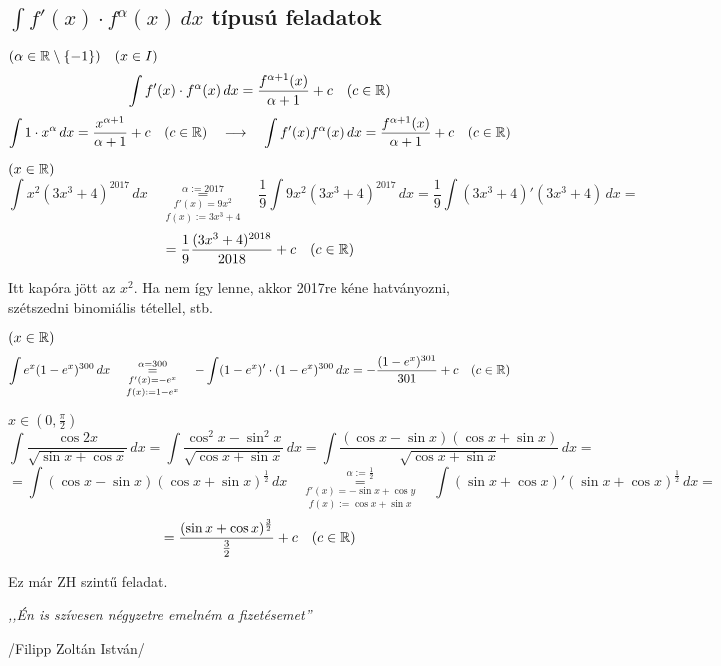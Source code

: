 \documentclass[a4paper,11.5pt]{article}
\begin{document}
	\subsection{$\int f'(x)\cdot f^\alpha(x)\,dx$ típusú feladatok}
	\begin{task} $(\alpha\in\mathbb{R}\setminus\{-1\})\quad (x\in I)$
		\[ \int f'(x)\cdot f^\alpha(x)\,dx=\frac{f^{\alpha+1}(x)}{\alpha+1}+c\quad (c\in\mathbb{R}) \]
		\[ \int 1\cdot x^\alpha\,dx=\frac{x^{\alpha+1}}{\alpha+1}+c\quad (c\in\mathbb{R})\quad \longrightarrow\quad \int f'(x)f^\alpha(x)\,dx=\frac{f^{\alpha+1}(x)}{\alpha+1}+c \quad (c\in\mathbb{R}) \]
	\end{task}
	\begin{task}
		$(x\in\mathbb{R})$
		\[ \int x^2(3x^3+4)^{2017}\,dx\quad \overset{\alpha:=2017}{\underset{f(x):=3x^3+4}{\underset{f'(x)=9x^2}{=}}}\quad \frac{1}{9}\int 9x^2(3x^3+4)^{2017}\,dx=\frac{1}{9}\int(3x^3+4)'(3x^3+4)\,dx=\]
		\[=\frac{1}{9}\frac{(3x^3+4)^{2018}}{2018}+c\quad (c\in\mathbb{R}) \]
		\begin{note}
			Itt kapóra jött az  $x^2$. Ha nem így lenne, akkor 2017re kéne hatványozni, szétszedni binomiális tétellel, stb.
		\end{note}
	\end{task}
	\begin{task}$(x\in\mathbb{R})$
		\[\int e^x (1-e^x)^{300}\,dx\quad \overset{\alpha=300}{\underset{f(x):=1-e^x}{\underset{f'(x)=-e^x}{=}}}\quad -\int(1-e^x)'\cdot(1-e^x)^{300}\,dx=-\frac{(1-e^x)^{301}}{301}+c\quad (c\in\mathbb{R}) \]
	\end{task}
	\begin{task}
		$x\in\left(0,\frac{\pi}{2}\right)$
		\[ \int\frac{\cos2x}{\sqrt{\sin x+\cos x}}\,dx = \int \frac{\cos^2 x-\sin^2 x}{\sqrt{\cos x+\sin x}}\,dx=\int\frac{(\cos x-\sin x)(\cos x+\sin x)}{\sqrt{\cos x+\sin x}}\,dx=\]
		\[=\int(\cos x-\sin x)(\cos x+\sin x)^{\frac{1}{2}}\,dx\quad \overset{\alpha:=\frac{1}{2}}{\underset{f(x):=\cos x+\sin x}{\underset{f'(x)=-\sin x+\cos y}{=}}}\quad \int(\sin x+\cos x)'(\sin x+\cos x)^{\frac{1}{2}}\,dx=\]
		\[=\frac{(\sin x + \cos x)^{\frac{3}{2}}}{\frac{3}{2}}+c\quad (c\in\mathbb{R}) \]
		\begin{note}
			Ez már ZH szintű feladat.
		\end{note}
		\begin{center}
			\textit{,,Én is szívesen négyzetre emelném a fizetésemet''}
			\smallskip
			
			/Filipp Zoltán István/
		\end{center}
	\end{task}
\end{document}
